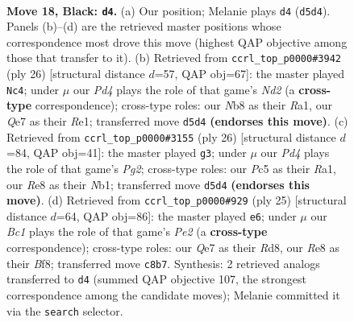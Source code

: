 \documentclass[11pt]{article}
\begin{document}
\clearpage

\begin{figure}[p]\centering
\begin{subfigure}{0.46\textwidth}\centering
\resizebox{\linewidth}{!}{%
\newchessgame
\chessboard[
  setfen={rnb1r3/3nq1kp/pp2p1p1/2ppP3/P7/2N5/1PPQ1PPP/1K2RBNR b - - 0 18},
  showmover=false,
  pgfstyle=straightmove, color=movearrow, markmove={d5-d4}
]}
\caption{}
\end{subfigure}\hfill
\begin{subfigure}{0.46\textwidth}\centering
\resizebox{\linewidth}{!}{%
\newchessgame
\chessboard[
  setfen={r1bqr1k1/2p2pp1/1bp2n1p/p3p3/4P3/2P2N1P/PPQN1PP1/R1B1R1K1 w - - 0 14},
  showmover=false,
  pgfstyle=straightmove, color=movearrow, markmove={d2-c4}
]}
\caption{}
\end{subfigure}
\\[4pt]
\begin{subfigure}{0.46\textwidth}\centering
\resizebox{\linewidth}{!}{%
\newchessgame
\chessboard[
  setfen={r1b1k2r/ppp1npp1/1q5p/1P2N3/2P2n2/2QP4/P4PPP/RN2KB1R w KQkq - 3 14},
  showmover=false,
  pgfstyle=straightmove, color=movearrow, markmove={g2-g3}
]}
\caption{}
\end{subfigure}\hfill
\begin{subfigure}{0.46\textwidth}\centering
\resizebox{\linewidth}{!}{%
\newchessgame
\chessboard[
  setfen={2kr1bnr/1pqnp1p1/p1p4p/3pP2P/6P1/3Q1N2/PPP1NP2/R1B1K2R b KQ - 0 13},
  showmover=false,
  pgfstyle=straightmove, color=movearrow, markmove={e7-e6}
]}
\caption{}
\end{subfigure}
\caption{\textbf{Move 18, Black: \texttt{d4}.} (a) Our position; Melanie plays \texttt{d4} (\texttt{d5d4}). Panels (b)--(d) are the retrieved master positions whose correspondence most drove this move (highest QAP objective among those that transfer to it). (b) Retrieved from \texttt{ccrl\_top\_p0000\#3942} (ply 26) [structural distance $d$=57, QAP obj=67]: the master played \texttt{Nc4}; under $\mu$ our \emph{Pd4} plays the role of that game's \emph{Nd2} (a \textbf{cross-type} correspondence); cross-type roles: our \emph{N}b8 as their \emph{R}a1, our \emph{Q}e7 as their \emph{R}e1; transferred move \texttt{d5d4} \textbf{(endorses this move)}. (c) Retrieved from \texttt{ccrl\_top\_p0000\#3155} (ply 26) [structural distance $d$=84, QAP obj=41]: the master played \texttt{g3}; under $\mu$ our \emph{Pd4} plays the role of that game's \emph{Pg2}; cross-type roles: our \emph{P}c5 as their \emph{R}a1, our \emph{R}e8 as their \emph{N}b1; transferred move \texttt{d5d4} \textbf{(endorses this move)}. (d) Retrieved from \texttt{ccrl\_top\_p0000\#929} (ply 25) [structural distance $d$=64, QAP obj=86]: the master played \texttt{e6}; under $\mu$ our \emph{Bc1} plays the role of that game's \emph{Pe2} (a \textbf{cross-type} correspondence); cross-type roles: our \emph{Q}e7 as their \emph{R}d8, our \emph{R}e8 as their \emph{B}f8; transferred move \texttt{c8b7}. Synthesis: 2 retrieved analogs transferred to \texttt{d4} (summed QAP objective 107, the strongest correspondence among the candidate moves); Melanie committed it via the \texttt{search} selector.}
\label{fig:thought-m35}
\end{figure}
\end{document}
